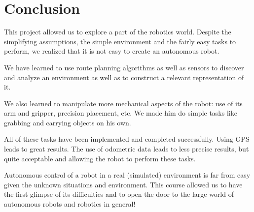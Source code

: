 \documentclass[a4paper, 10pt, conference]{ieeeconf}
\begin{document}
    
    \section{Conclusion}
    
    This project allowed us to explore a part of the robotics world. Despite the simplifying assumptions, the simple environment and the fairly easy tasks to perform, we realized that it is not easy to create an autonomous robot.
    
    We have learned to use route planning algorithms as well as sensors to discover and analyze an environment as well as to construct a relevant representation of it.
    
    We also learned to manipulate more mechanical aspects of the robot: use of its arm and gripper, precision placement, etc. We made him do simple tasks like grabbing and carrying objects on his own.
    
    All of these tasks have been implemented and completed successfully. Using GPS leads to great results. The use of odometric data leads to less precise results, but quite acceptable and allowing the robot to perform these tasks.
    
    Autonomous control of a robot in a real (simulated) environment is far from easy given the unknown situations and environment. This course allowed us to have the first glimpse of its difficulties and to open the door to the large world of autonomous robots and robotics in general!
    
    
    
    
    \nocite{*}
    
    
    \newpage
    
\end{document}
